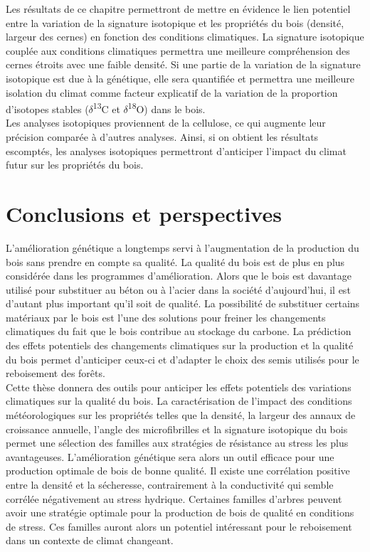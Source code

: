 \documentclass[a4paper,12pt]{report}
\newcommand{\Ctreize}{$\delta$\textsuperscript{13}C\xspace}
\newcommand{\Odixhuit}{$\delta$\textsuperscript{18}O\xspace}
\begin{document}
Les résultats de ce chapitre permettront de mettre en évidence le lien potentiel entre la variation de la signature isotopique et les propriétés du bois (densité, largeur des cernes) en fonction des conditions climatiques. La signature isotopique couplée aux conditions climatiques permettra une meilleure compréhension des cernes étroits avec une faible densité. Si une partie de la variation de la signature isotopique est due à la génétique, elle sera quantifiée et permettra une meilleure isolation du climat comme facteur explicatif de la variation de la proportion d'isotopes stables (\Ctreize et \Odixhuit) dans le bois.\\

Les analyses isotopiques proviennent de la cellulose, ce qui augmente leur précision comparée à d'autres analyses. Ainsi, si on obtient les résultats escomptés, les analyses isotopiques permettront d'anticiper l'impact du climat futur sur les propriétés du bois. %

\clearpage %

\chapter*{Conclusions et perspectives}

L'amélioration génétique a longtemps servi à l'augmentation de la production du bois sans prendre en compte sa qualité. La qualité du bois est de plus en plus considérée dans les programmes d'amélioration. Alors que le bois est davantage utilisé pour substituer au  béton ou à l'acier dans la société d'aujourd'hui, il est d'autant plus important qu'il soit de qualité. La possibilité de substituer certains matériaux par le bois est l'une des solutions pour freiner les changements climatiques du fait que le bois contribue au stockage du carbone. La prédiction des effets potentiels des changements climatiques sur la production et la qualité du bois permet d'anticiper ceux-ci et d'adapter le choix des semis utilisés pour le reboisement des forêts. \\

Cette thèse donnera des outils pour anticiper les effets potentiels des variations climatiques sur la qualité du bois. La caractérisation de l'impact des conditions météorologiques sur les propriétés telles que la densité, la largeur des annaux de croissance annuelle, l'angle des microfibrilles et la signature isotopique du bois permet une sélection des familles aux stratégies de résistance au stress les plus avantageuses. L'amélioration génétique sera alors un outil efficace pour une production optimale de bois de bonne qualité. Il existe une corrélation positive entre la densité et la sécheresse, contrairement à la conductivité qui semble corrélée négativement au stress hydrique. Certaines familles d'arbres peuvent avoir une stratégie optimale pour la production de bois de qualité en conditions de stress. Ces familles auront alors un potentiel intéressant pour le reboisement dans un contexte de climat changeant. \\
\end{document}

